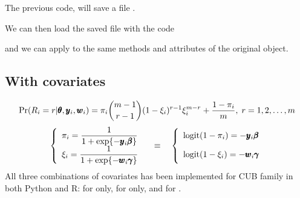 \documentclass[letterpaper,10pt,english]{sphinxmanual}
\begin{document}
\sphinxAtStartPar
The previous code, will save a file .

\sphinxAtStartPar
We can then load the saved file with the code
\def\sphinxLiteralBlockLabel{\label{\detokenize{manual:id43}}}
\begin{sphinxVerbatim}[commandchars=\\\{\},numbers=left,firstnumber=1,stepnumber=1]
   

  
\end{sphinxVerbatim}

\sphinxAtStartPar
and we can apply to  the same methods and attributes of the original  object.


\subsection{With covariates}
\label{\detokenize{manual:with-covariates}}\label{\detokenize{manual:cub-with-covariates}}
\sphinxAtStartPar
{}

\sphinxAtStartPar
{}

\sphinxAtStartPar
{}
\begin{equation*}
\begin{split}\Pr(R_i=r|\pmb\theta, \pmb y_i, \pmb w_i) = \pi_i \dbinom{m-1}{r-1}(1-\xi_i)^{r-1}\xi_i^{m-r}+\dfrac{1-\pi_i}{m}
,\; r = 1,2,\ldots,m\end{split}
\end{equation*}\begin{equation*}
\begin{split}\left\{
\begin{array}{l}
    \pi_i = \dfrac{1}{1+\exp\{-\pmb y_i \pmb \beta\}}
    \\
    \xi_i = \dfrac{1}{1+\exp\{-\pmb w_i \pmb \gamma\}}
\end{array}
\right.
\quad \equiv \quad
\left\{
\begin{array}{l}
    \mathrm{logit}(1-\pi_i) = - \pmb y_i \pmb \beta
    \vphantom{\dfrac{1}{1+\exp\{-\pmb y_i \pmb \beta\}}}
    \\
    \mathrm{logit}(1-\xi_i) = - \pmb w_i \pmb \gamma
    \vphantom{\dfrac{1}{1+\exp\{-\pmb w_i \pmb \gamma\}}}
\end{array}
\right.\end{split}
\end{equation*}
\sphinxAtStartPar
All three combinations of covariates has been implemented for CUB family in both Python and R:
for  only, for  only, and for .
\end{document}
